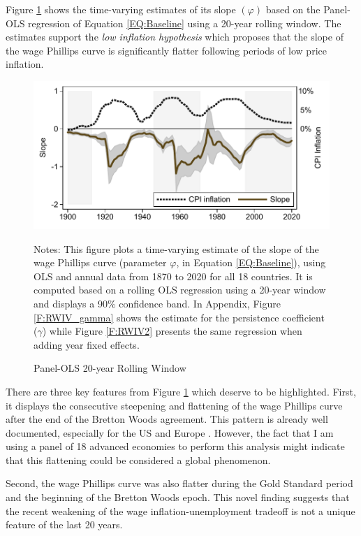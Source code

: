 \documentclass[12pt]{article}
\newcommand{\annote}[1]{\parbox{\textwidth}{\renewcommand{\baselinestretch}{1.0}\vspace{12pt} \footnotesize Notes: #1}}
\begin{document}
Figure \ref{F:RWIV} shows the time-varying estimates of its slope $(\varphi)$ based on the Panel-OLS regression of Equation \eqref{EQ:Baseline} using a 20-year rolling window. The estimates support the \textit{low inflation hypothesis} which proposes that the slope of the wage Phillips curve is significantly flatter following periods of low price inflation.


\begin{figure}[h]
    \centering
    \caption{Panel-OLS 20-year Rolling Window}
    \includegraphics[scale=1]{../Output/Figures/RW_dwn_OLS}
    \annote{\footnotesize This figure plots a time-varying estimate of the slope of the wage Phillips curve (parameter $\varphi$, in Equation \eqref{EQ:Baseline}), using OLS and annual data from 1870 to 2020 for all 18 countries. It is computed based on a rolling OLS regression using a 20-year window and displays a 90\% confidence band. In Appendix, Figure \ref{F:RWIV_gamma} shows the estimate for the persistence coefficient ($\gamma$) while Figure \ref{F:RWIV2} presents the same regression when adding year fixed effects.}
    \label{F:RWIV}
\end{figure}

There are three key features from Figure \ref{F:RWIV} which deserve to be highlighted. First, it displays the consecutive steepening and flattening of the wage Phillips curve after the end of the Bretton Woods agreement. This pattern is already well documented, especially for the US \citep{Ball2011, Blanchard2015, Blanchard2016, Gali2019} and Europe \citep{Bonam2021}. However, the fact that I am using a panel of 18 advanced economies to perform this analysis might indicate that this flattening could be considered a global phenomenon.

Second, the wage Phillips curve was also flatter during the Gold Standard period and the beginning of the Bretton Woods epoch. This novel finding suggests that the recent weakening of the wage inflation-unemployment tradeoff is not a unique feature of the last 20 years.
\end{document}
